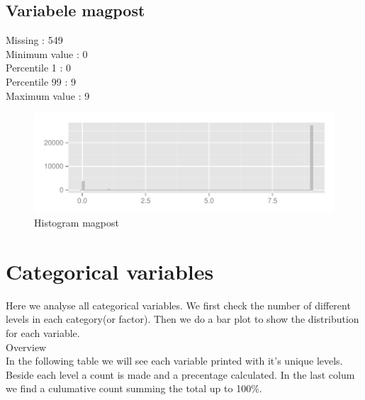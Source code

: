 \documentclass[10pt,a4paper,titlepage]{report}
\begin{document}

\subsection{Variabele magpost}

Missing :  549 \\
Minimum value : 0\\
Percentile 1 : 0\\
Percentile 99 : 9\\
Maximum value : 9

\color{red}


\color{black}

\begin{figure}[H]
   \centering
\begin{knitrout}
\color{fgcolor}\begin{kframe}


{\ttfamily\noindent\color{warningcolor}{\#\# Warning: position\_stack requires constant width: output may be incorrect}}\end{kframe}
\includegraphics[width=\maxwidth]{figure/unnamed-chunk-26} 

\end{knitrout}

    \caption{Histogram magpost}
    \label{fig:figPlot13}
\end{figure}


\newpage
\section{Categorical variables}
Here we analyse all categorical variables. We first check the number of different levels in each category(or factor). Then we do a bar plot to show the distribution for each variable.
\\
Overview\\
In the following table we will see each variable printed with it's unique levels. Beside each level a count is made and a precentage calculated. In the last colum we find a culumative count summing the total up to 100\%. 
\end{document}
